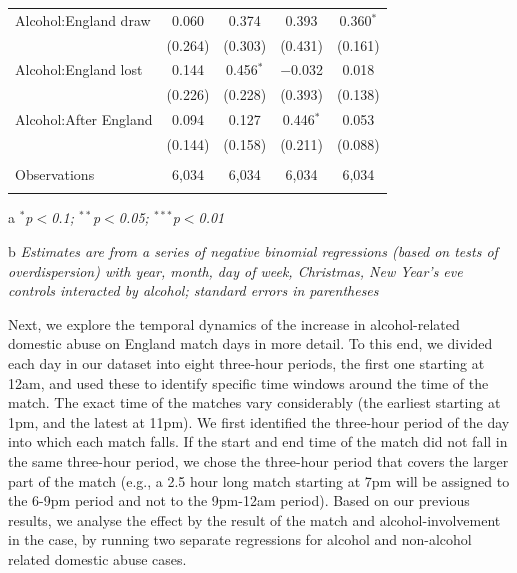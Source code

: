 \documentclass[12pt, letterpaper]{article}
\begin{document}
\begin{table}[!htbp]
{\begin{threeparttable}
\begin{tabular}{@{\extracolsep{5pt}}lcccc}
  Alcohol:England draw & 0.060 & 0.374 & 0.393 & 0.360$^{*}$ \\ 
  & (0.264) & (0.303) & (0.431) & (0.161) \\ 
  Alcohol:England lost & 0.144 & 0.456$^{*}$ & $-$0.032 & 0.018 \\ 
  & (0.226) & (0.228) & (0.393) & (0.138) \\ 
  Alcohol:After England & 0.094 & 0.127 & 0.446$^{*}$ & 0.053 \\ 
  & (0.144) & (0.158) & (0.211) & (0.088) \\ 
 \hline \\[-1.8ex] 
Observations & 6,034 & 6,034 & 6,034 & 6,034 \\ 
\hline 
\hline \\[-1.8ex] 
\end{tabular} 
\begin{tablenotes}
      \item[a] \textit{$^{*}$p$<$0.1; $^{**}$p$<$0.05; $^{***}$p$<$0.01}
      \item[b] \textit{Estimates are from a series of negative binomial regressions (based on tests of overdispersion)  with year, month, day of week, Christmas, New Year's eve controls interacted by alcohol; standard errors in parentheses}
    \end{tablenotes}
\end{threeparttable} }
\end{table}


Next, we explore the temporal dynamics of the increase in alcohol-related domestic abuse on England match days in more detail. To this end, we divided each day in our dataset into eight three-hour periods, the first one starting at 12am, and used these to identify specific time windows around the time of the match. The exact time of the matches vary considerably (the earliest starting at 1pm, and the latest at 11pm). We first identified the three-hour period of the day into which each match falls. If the start and end time of the match did not fall in the same three-hour period, we chose the three-hour period that covers the larger part of the match (e.g., a 2.5 hour long match starting at 7pm will be assigned to the 6-9pm period and not to the 9pm-12am period). Based on our previous results, we analyse the effect by the result of the match and alcohol-involvement in the case, by running two separate regressions for alcohol and non-alcohol related domestic abuse cases.
\end{document}
